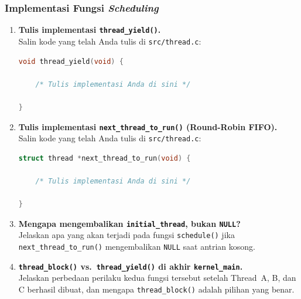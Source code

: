 \subsubsection{Implementasi Fungsi \textit{Scheduling}}

\begin{enumerate}

	\item \textbf{Tulis implementasi \texttt{thread\_yield()}.}\\
	      Salin kode yang telah Anda tulis di \texttt{src/thread.c}:

	      \begin{lstlisting}[language=c, caption={Implementasi \texttt{thread\_yield()} oleh mahasiswa}]
void thread_yield(void) {

    /* Tulis implementasi Anda di sini */

}
    \end{lstlisting}

	\item \textbf{Tulis implementasi \texttt{next\_thread\_to\_run()}
		      (Round-Robin FIFO).}\\
	      Salin kode yang telah Anda tulis di \texttt{src/thread.c}:

	      \begin{lstlisting}[language=c, caption={Implementasi \texttt{next\_thread\_to\_run()} oleh mahasiswa}]
struct thread *next_thread_to_run(void) {

    /* Tulis implementasi Anda di sini */

}
    \end{lstlisting}

	\item \textbf{Mengapa mengembalikan \texttt{initial\_thread},
		      bukan \texttt{NULL}?}\\
	      Jelaskan apa yang akan terjadi pada fungsi \texttt{schedule()} jika
	      \texttt{next\_thread\_to\_run()} mengembalikan \texttt{NULL} saat
	      antrian kosong.

	\item \textbf{\texttt{thread\_block()} vs.\ \texttt{thread\_yield()}
		      di akhir \texttt{kernel\_main}.}\\
	      Jelaskan perbedaan perilaku kedua fungsi tersebut setelah Thread~A,
	      B, dan C berhasil dibuat, dan mengapa \texttt{thread\_block()}
	      adalah pilihan yang benar.

\end{enumerate}

